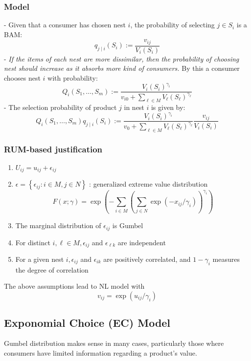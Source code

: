 \documentclass[11pt]{elegantbook}
\begin{document}
\subsubsection{Model}
- Given that a consumer has chosen nest $i$, the probability of selecting $j \in S_{i}$ is a BAM:
$$
q_{j \mid i}\left(S_{i}\right):=\frac{v_{i j}}{V_{i}\left(S_{i}\right)}
$$
- \textit{If the items of each nest are more dissimilar, then the probability of choosing nest should increase as it absorbs more kind of consumers.} By this a consumer chooses nest $i$ with probability:
$$
Q_{i}\left(S_{1}, \ldots, S_{m}\right):=\frac{V_{i}\left(S_{i}\right)^{\gamma_{i}}}{v_{i 0}+\sum_{\ell \in M} V_{\ell}\left(S_{\ell}\right)^{\gamma_{\ell}}}
$$
- The selection probability of product $j$ in nest $i$ is given by:
$$
Q_{i}\left(S_{1}, \ldots, S_{m}\right) q_{j \mid i}\left(S_{i}\right):=\frac{V_{i}\left(S_{i}\right)^{\gamma_{i}}}{v_{0}+\sum_{\ell \in M} V_{\ell}\left(S_{\ell}\right)^{\gamma_{\ell}}} \frac{v_{i j}}{V_{i}\left(S_{i}\right)}
$$

\subsubsection{RUM-based justification}
\begin{enumerate}[$\bullet$]
    \item $U_{i j}=u_{i j}+\epsilon_{i j}$
    \item $\epsilon=\left\{\epsilon_{i j}: i \in M, j \in N\right\}$ : generalized extreme value distribution
    $$
    F(x ; \gamma)=\exp \left(-\sum_{i \in M}\left(\sum_{j \in N} \exp \left(-x_{i j} / \gamma_{i}\right)\right)^{\gamma_{i}}\right)
    $$
    \item The marginal distribution of $\epsilon_{i j}$ is Gumbel
    \item For distinct $i, \ell \in M, \epsilon_{i j}$ and $\epsilon_{\ell k}$ are independent
    \item For a given nest $i, \epsilon_{i j}$ and $\epsilon_{i k}$ are positively correlated, and $1-\gamma_{i}$ measures the degree of correlation
\end{enumerate}
The above assumptions lead to NL model with
$$
v_{i j}=\exp \left(u_{i j} / \gamma_{i}\right)
$$




\subsection{Exponomial Choice (EC) Model}
Gumbel distribution makes sense in many cases, particularly those where consumers have limited information regarding a product’s value.
\end{document}
